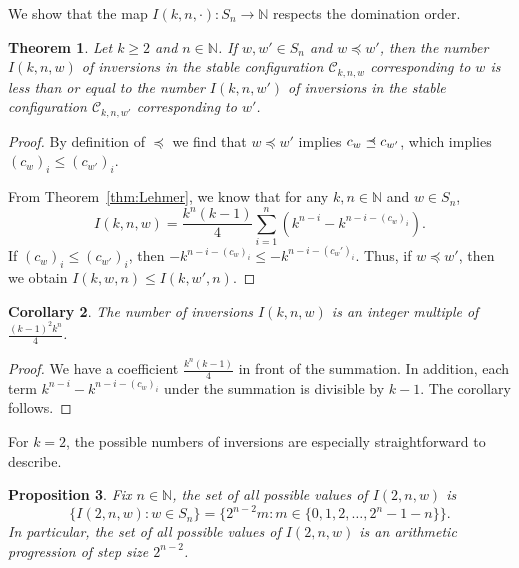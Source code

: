 \documentclass[final]{dmtcs-episciences}
\newtheorem{theorem}{Theorem}[section]
\newtheorem{corollary}[theorem]{Corollary} %
\newtheorem{proposition}[theorem]{Proposition}
\theoremstyle{definition}
\theoremstyle{remark}
\newcommand\preceqdot{\mathrel{\ooalign{$\preceq$\cr
\hidewidth\raise0.225ex\hbox{$\cdot\mkern0.5mu$}\cr}}}
\begin{document}
We show that the map $I(k, n, \cdot): S_n \to \mathbb{N}$ respects the domination order.

\begin{theorem}
\label{thm:inversionorder}
Let $k \geq 2$ and $n \in \mathbb{N}$. If $w, w' \in S_n$ and $w \preceq w'$, then the number $I(k, n, w)$ of inversions in the stable configuration $\mathcal{C}_{k, n, w}$ corresponding to $w$ is less than or equal to the number $I(k, n, w')$ of inversions in the stable configuration $\mathcal{C}_{k, n, w'}$ corresponding to $w'$.
\end{theorem}

\begin{proof}
By definition of $\preceq$ we find that $w \preceq w'$ implies $c_{w} \preceqdot c_{w'}$, which implies $(c_{w})_i \leq (c_{w'})_i$.

From Theorem~\ref{thm:Lehmer}, we know that for any $k, n \in \mathbb{N}$ and $w \in S_n$,
\begin{equation*}
I(k, n, w) = \frac{k^n(k-1)}{4}\sum_{i=1}^n(k^{n-i} -k^{n-i-(c_w)_i}).
\end{equation*}
If $(c_{w})_i \leq (c_{w'})_i$, then $-k^{n-i-(c_w)_i} \leq -k^{n-i-(c_w')_i}$. Thus, if $w \preceq w'$, then we obtain $I(k, w, n) \leq I(k, w', n)$.\end{proof}

\begin{corollary}
\label{cor:CorollaryNumInveresions}
    The number of inversions $I(k,n,w)$ is an integer multiple of $\frac{(k-1)^2k^n}{4}$.
\end{corollary}

\begin{proof}
    We have a coefficient $\frac{k^n(k-1)}{4}$ in front of the summation. In addition, each term $k^{n-i} -k^{n-i-(c_w)_i}$ under the summation is divisible by $k-1$. The corollary follows.
\end{proof}
For $k = 2$, the possible numbers of inversions are especially straightforward to describe.

\begin{proposition}\label{prop:k2caseInversionsArithmeticProgression}
    Fix $n \in \mathbb{N}$, the set of all possible values of $I(2, n, w)$ is $$\{I(2, n, w): w \in S_n\} = \{2^{n-2} m: m \in \{0, 1,2, \dots, 2^n-1-n\}\}.$$ In particular, the set of all possible values of $I(2, n, w)$ is an arithmetic progression of step size $2^{n-2}$.
\end{proposition}
\end{document}

